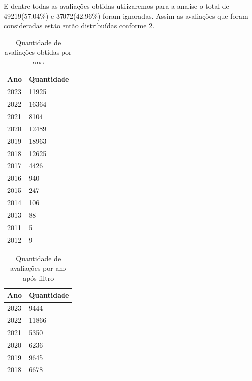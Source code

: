 E dentre todas as avaliações obtidas utilizaremos para a analise o total de 49219(57.04\%) e 37072(42.96\%) foram ignoradas. Assim as avaliações que foram consideradas estão então distribuídas conforme \ref{table:distribuicao_review_per_year}.


\begin{table}[]
	\centering
	\begin{tabular}{|l|l|}
		\textbf{Ano} & \textbf{Quantidade} \\\hline
		2023         & 11925               \\
		2022         & 16364               \\
		2021         & 8104                \\
		2020         & 12489               \\
		2019         & 18963               \\
		2018         & 12625               \\
		2017         & 4426                \\
		2016         & 940                 \\
		2015         & 247                 \\
		2014         & 106                 \\
		2013         & 88                  \\
		2011         & 5                   \\
		2012         & 9
	\end{tabular}%
	\caption{Quantidade de avaliações obtidas por ano}
	\label{table:review_per_year}
\end{table}

\begin{table}[]
	\centering
	\begin{tabular}{|l|l|}
		\textbf{Ano} & \textbf{Quantidade} \\\hline
		2023         & 9444                \\
		2022         & 11866               \\
		2021         & 5350                \\
		2020         & 6236                \\
		2019         & 9645                \\
		2018         & 6678
	\end{tabular}
	\caption{Quantidade de avaliações por ano após filtro}
	\label{table:distribuicao_review_per_year}
\end{table}

